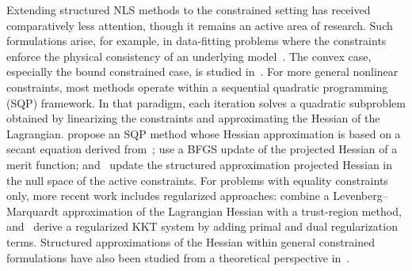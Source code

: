 Extending structured NLS methods to the constrained setting has received comparatively less attention, though it remains an active area of research. Such formulations arise, for example, in data-fitting problems where the constraints enforce the physical consistency of an underlying model~\cite{grenieretal:2006, delbos-etal2006, pu-etal:2015}. The convex case, especially the bound constrained case, is studied in~\cite{bellavia-etal:2004, bellavia-etal:2011, porcelli:2013, goncalvesmenezes:2020}.
For more general nonlinear constraints, most methods operate within a sequential quadratic programming (SQP) framework. In that paradigm, each iteration solves a quadratic subproblem obtained by linearizing the constraints and approximating the Hessian of the Lagrangian. \cite{li-etal:2002} propose an SQP method whose Hessian approximation
is based on a secant equation derived from~\cite{biggs:1977}; \cite{tjoabiegler:1991} use a BFGS update of the projected Hessian of a merit function; and~\cite{amiribartels:1989} update the structured  approximation projected Hessian in the null space of the active constraints.
For problems with equality constraints only, more recent work includes regularized approaches: \cite{bergou-etal:2021} combine a Levenberg--Marquardt approximation of the Lagrangian Hessian with a trust-region method, and~\cite{orbansiquiera:2020} derive a regularized KKT system by adding primal and dual regularization terms.
Structured approximations of the Hessian within general constrained	formulations have also been studied from a theoretical perspective in~\cite{tapia:1988}.

